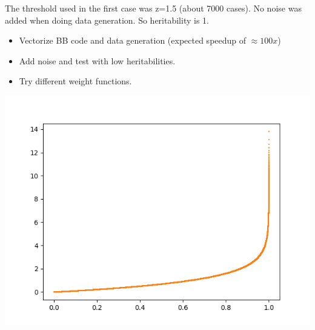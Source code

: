 \documentclass[11pt]{hw-template}
\begin{document}
The threshold used in the first case was z=1.5 (about 7000 cases). No noise was added when doing data generation. So heritability is 1.

\begin{itemize}
  \item Vectorize BB code and data generation (expected speedup of $\approx 100x$)
  \item Add noise and test with low heritabilities.
  \item Try different weight functions.
\end{itemize}

\includegraphics[width=0.99\linewidth]{log.png}
\end{document}
